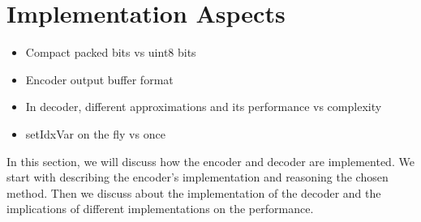 \section{Implementation Aspects}
\begin{itemize}
  \item Compact packed bits vs uint8 bits
  \item Encoder output buffer format
  \item In decoder, different approximations and its performance vs complexity
  \item setIdxVar on the fly vs once
\end{itemize}
In this section, we will discuss how the encoder and decoder are implemented. We start with describing the encoder's implementation and reasoning the chosen method. Then we discuss about the implementation of the decoder and the implications of different implementations on the performance.
